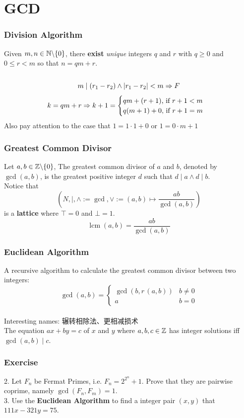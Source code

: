 \documentclass{beamer}
\begin{document}
\section{GCD}
\begin{frame}
    \frametitle{Division Algorithm}
    \hh Given $m, n \in \mathbb{N} \backslash \{0\}$, there \textbf{exist} \textit{unique} 
    integers $q$ and $r$ with $q \geq 0$ and $0 \leq r < m$ so that $n = qm + r$.
    \\\vs{0.5em}\large{}
    \\\vs{0.5em}
    $$m \mid (r_1-r_2) \wedge |r_1-r_2| < m\Rightarrow F$$
    $$k=qm+r \Rightarrow k+1 =
        \begin{cases}
            qm + (r+1) \text{, if }r+1<m\\
            q(m+1) + 0 \text{, if }r+1=m
        \end{cases}
    $$
    Also pay attention to the case that
    $1= 1 \cdot 1+0 \text{ or } 1 = 0 \cdot m +1$
\end{frame}
\begin{frame}
    \frametitle{Greatest Common Divisor}
    \hh Let $a, b \in \mathbb{Z} \backslash \{0\}$, The greatest common divisor of $a$ and $b$,
    denoted by $\gcd(a, b)$, is the greatest positive integer $d$ such that
    $d\mid a \wedge d \mid b$.\\
    \vv
    \hh Notice that $$(N, \mid, \wedge := \gcd, \vee := (a, b) \mapsto \frac{ab}{\gcd(a,b)}
    )$$ is a \textbf{lattice} where $\top  = 0$ and $\bot = 1$.
    \\ \vv
    $$\operatorname{lcm}(a,b)=\frac{ab}{\gcd(a,b)}$$
\end{frame}
\begin{frame}
    \frametitle{Euclidean Algorithm}
    \hh A recursive algorithm to calculate the greatest
    common divisor between two integers:
    $$\operatorname{gcd}(a, b)= \begin{cases}\operatorname{gcd}(b, r\,(a, b)) & b \neq 0 \\ a & b=0\end{cases}$$
    \\ \hh *Interesting names: {\kaishu 辗转相除法、更相减损术}\\\vv
    \hh The equation $ax + by = c$ of $x$ and $y$ where $a, b, c \in \mathbb{Z}$ has integer
    solutions iff $\gcd(a, b)\mid c$.
\end{frame}
\begin{frame}
    \frametitle{Exercise}
    2. Let $F_n$ be Fermat Primes, i.e. $F_n=2^{2^n} +1$. Prove that they are 
    pairwise coprime, namely $\gcd(F_n,F_m)=1.$
    \\\vs{5em}
    3. Use the \textbf{Euclidean Algorithm} to find a integer pair $(x,y)$ that 
    $111x-321y=75.$ 
\end{frame}
\end{document}
